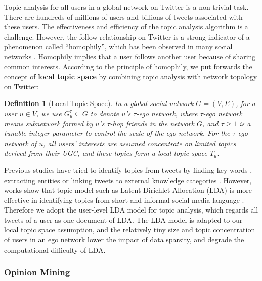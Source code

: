 \documentclass[letterpaper]{article}
\newtheorem{definition}{Definition}
\begin{document}
Topic analysis for all users in a global network on Twitter is a non-trivial task. 
There are hundreds of millions of users and billions of tweets associated with these users. The effectiveness and efficiency of the topic analysis algorithm is a challenge.
However, the follow relationship on Twitter is a strong indicator of a phenomenon called ``homophily'', which has been observed in many social networks \cite{mcpherson2001birds}.
Homophily implies that a user follows another user because of sharing common interests. 
According to the principle of homophily, we put forwards the concept of \textbf{local topic space} by combining topic analysis with network topology on Twitter: 
\begin{definition}[Local Topic Space]
\label{local}
In a global social network $G=\left( V,E \right) $, for a user $ u \in V $, we use $ G_{u}^{\tau} \subseteq G$ 
to denote $ u $'s $ \tau $-ego network, where $ \tau $-ego network means subnetwork formed by $ u $'s $ \tau $-hop 
friends in the network $ G $, and $ \tau \geqslant 1 $ is a tunable integer parameter to control the scale of the ego network. 
For the $ \tau $-ego network of $ u $, all users' interests are assumed concentrate on limited topics derived from their UGC, and these topics form a local topic space $ T_{u} $.
\end{definition}

Previous studies have tried to identify topics from tweets by finding key words \cite{chen2010short}, extracting  entities \cite{abel2011analyzing} or linking tweets to external knowledge categories \cite{macskassy2011people}. However, works show that topic model such as Latent Dirichlet Allocation (LDA) \cite{blei2003latent} is more effective in identifying topics from short and informal social media language \cite{hong2010empirical}. Therefore we adopt the user-level LDA model for topic analysis, which regards all tweets of a user as one document of LDA. The LDA model is adapted to our local topic space assumption, and the relatively tiny size and topic concentration of users in an ego network lower the impact of data sparsity, and degrade the computational difficulty of LDA. 

\subsubsection{Opinion Mining}
\label{opinion}
\end{document}
